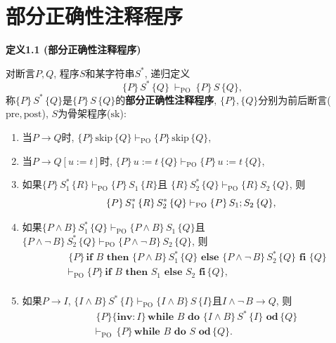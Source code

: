 \documentclass[UTF8]{ctexart}
\begin{document}
\setlength{\abovedisplayskip}{1pt}
\setlength{\belowdisplayskip}{1pt}

\section{部分正确性注释程序}

\hypertarget{sec:定义1.1}{}
\noindent\textbf{定义1.1 (部分正确性注释程序)}

对断言$P,Q$, 程序$S$和某字符串$S^*$, 递归定义
\[
    \{P\}\,S^*\,\{Q\}\ \vdash_{\mathrm{PO}}\ \{P\}\,S\,\{Q\},
\]
称$\{P\}\,S^*\,\{Q\}$是$\{P\}\,S\,\{Q\}$的\textbf{部分正确性注释程序},
$\{P\},\{Q\}$分别为前后断言($\mathrm{pre},\mathrm{post}$),
$S$为骨架程序($\mathrm{sk}$):
\vspace{1pt}
\begin{enumerate}
    \item 当$P\to Q$时, $\{P\}\,\mathrm{skip}\,\{Q\}\vdash_{\mathrm{PO}}
    \{P\}\,\mathrm{skip}\,\{Q\}$,
    \item 当$P\to Q[u:=t]$时, $\{P\}\,u:=t\,\{Q\}\vdash_{\mathrm{PO}}
    \{P\}\,u:=t\,\{Q\}$,
    \item 如果$\{P\}\,S_1^*\,\{R\}\vdash_{\mathrm{PO}}\{P\}\,S_1\,\{R\}$且
    $\{R\}\,S_2^*\,\{Q\}\vdash_{\mathrm{PO}}\{R\}\,S_2\,\{Q\}$, 则
    \vspace{1pt}
    \[
        \{P\}\,S_1^*\,\{R\}\,S_2^*\,\{Q\}\vdash_{\mathrm{PO}}
        \{P\}\,S_1;S_2\,\{Q\},\\[1pt]
    \]
    \item 如果$\{P\land B\}\,S_1^*\,\{Q\}\vdash_{\mathrm{PO}}
    \{P\land B\}\,S_1\,\{Q\}$且$\{P\land\neg\,B\}\,S_2^*\,\{Q\}
    \vdash_{\mathrm{PO}}\{P\land\neg\,B\}\,S_2\,\{Q\}$, 则
    \vspace{1pt}
    \[\begin{aligned}
        &\,\,\{P\}\,\mathbf{if}\,\,B\,\,\mathbf{then}\,\,
        \{P\land B\}\,S_1^*\,\{Q\}\,\,\mathbf{else}\,\,\{P\land\neg\,B\}\,S_2^*
        \,\{Q\}\,\,\mathbf{fi}\,\,\{Q\}\\[-3pt]
        \,&\vdash_{\mathrm{PO}}\{P\}\,\mathbf{if}\,\,B\,\,\mathbf{then}\,\,S_1
        \,\,\mathbf{else}\,\,S_2\,\,\mathbf{fi}\,\{Q\},\\[2pt]
    \end{aligned}\]
    \item 如果$P\to I$, $\{I\land B\}\,S^*\,\{I\}
    \vdash_{\mathrm{PO}}\{I\land B\}\,S\,\{I\}$且$I\land\neg\,B\to Q$, 则
    \vspace{1pt}
    \[\begin{aligned}
        &\,\,\{P\}\{\mathbf{inv}:I\}\,\mathbf{while}\,\,B\,\,
        \mathbf{do}\,\,\{I\land B\}\,S^*\,\{I\}
        \,\,\mathbf{od}\,\{Q\}\,\\[-3pt]
        \,&\vdash_{\mathrm{PO}}\,\{P\}\,\mathbf{while}\,\,B
        \,\,\mathbf{do}\,\,S\,\,\mathbf{od}\,\{Q\}.
    \end{aligned}\]
\end{enumerate}
\end{document}
